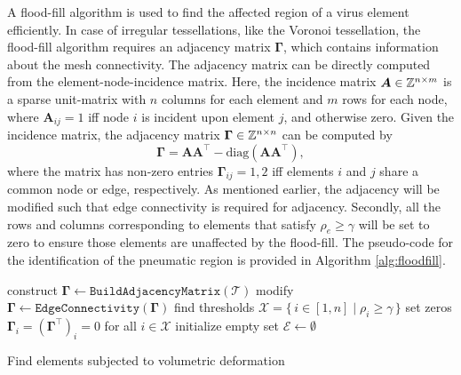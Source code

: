A flood-fill algorithm is used \cite{Chartrand1977Jan} to find the affected region of a virus element efficiently. In case of irregular tessellations, like the Voronoi tessellation, the flood-fill algorithm requires an adjacency matrix $\boldsymbol{\Gamma}$, which contains information about the mesh connectivity. The adjacency matrix can be directly computed from the element-node-incidence matrix. Here, the incidence matrix $\boldsymbol{A} \in \mathbb{Z}^{n\times m}$ is a sparse unit-matrix with $n$ columns for each element and $m$ rows for each node, where $\boldsymbol{A}_{ij} = 1$ iff node $i$ is incident upon element $j$, and otherwise zero. Given the incidence matrix, the adjacency matrix $\boldsymbol{\Gamma}\in \mathbb{Z}^{n\times n}$ can be computed by
%
\begin{equation}
\boldsymbol{\Gamma} = \boldsymbol{A}\boldsymbol{A}^\top - \text{diag}(\boldsymbol{A}\boldsymbol{A}^\top), \label{eq:adjecency}
\end{equation}
%
where the matrix has non-zero entries $\boldsymbol{\Gamma}_{ij} = 1,2$ iff elements $i$ and $j$ share a common node or edge, respectively. As mentioned earlier, the adjacency will be modified such that edge connectivity is required for adjacency. Secondly, all the rows and columns corresponding to elements that satisfy $\rho_e \ge \gamma$ will be set to zero to ensure those elements are unaffected by the flood-fill. The pseudo-code for the identification of the pneumatic region is provided in Algorithm \ref{alg:floodfill}.

\begin{algorithm}[!t]
    construct $\boldsymbol{\Gamma}  \gets {\texttt{BuildAdjacencyMatrix}}(\mathcal{T})$\;
    modify $\boldsymbol{\Gamma}  \gets {\texttt{EdgeConnectivity}}(\boldsymbol{\Gamma})$\;
    find thresholds $\mathcal{X} = \{\, i \in [1,n] \;|\; \rho_i \ge \gamma \,\}$\;
    set zeros $\boldsymbol{\Gamma}_i = (\boldsymbol{\Gamma}^\top)_i = 0$ for all $i \in  \mathcal{X}$\;
    initialize empty set $\mathcal{E} \gets \emptyset$\;
    \caption{Find elements subjected to volumetric deformation \label{alg:floodfill}}
\end{algorithm}

